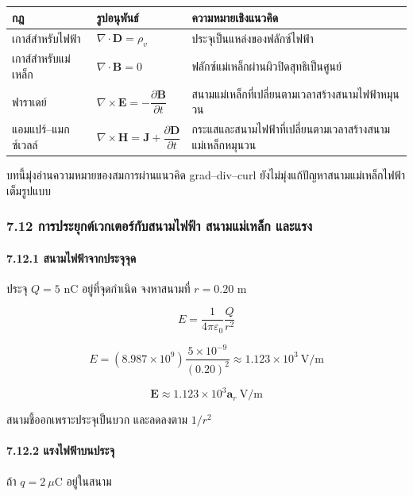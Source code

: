 \begin{table}[htbp]
    \centering
    \begin{tabularx}{\textwidth}{L{0.20\textwidth} L{0.28\textwidth} Y}
        \hline
        \textbf{กฎ} & \textbf{รูปอนุพันธ์} & \textbf{ความหมายเชิงแนวคิด} \\
        \hline
        เกาส์สำหรับไฟฟ้า & \(\nabla\cdot\mathbf{D}=\rho_v\) & ประจุเป็นแหล่งของฟลักซ์ไฟฟ้า \\
        เกาส์สำหรับแม่เหล็ก & \(\nabla\cdot\mathbf{B}=0\) & ฟลักซ์แม่เหล็กผ่านผิวปิดสุทธิเป็นศูนย์ \\
        ฟาราเดย์ & \(\nabla\times\mathbf{E}=-\dfrac{\partial\mathbf{B}}{\partial t}\) & สนามแม่เหล็กที่เปลี่ยนตามเวลาสร้างสนามไฟฟ้าหมุนวน \\
        แอมแปร์--แมกซ์เวลล์ & \(\nabla\times\mathbf{H}=\mathbf{J}+\dfrac{\partial\mathbf{D}}{\partial t}\) & กระแสและสนามไฟฟ้าที่เปลี่ยนตามเวลาสร้างสนามแม่เหล็กหมุนวน \\
        \hline
    \end{tabularx}
\end{table}

บทนี้มุ่งอ่านความหมายของสมการผ่านแนวคิด grad--div--curl ยังไม่มุ่งแก้ปัญหาสนามแม่เหล็กไฟฟ้าเต็มรูปแบบ

\subsubsection{7.12 การประยุกต์เวกเตอร์กับสนามไฟฟ้า สนามแม่เหล็ก และแรง}

\paragraph{7.12.1 สนามไฟฟ้าจากประจุจุด}

ประจุ \(Q=5\) nC อยู่ที่จุดกำเนิด จงหาสนามที่ \(r=0.20\) m

\[
E=\frac{1}{4\pi\varepsilon_0}\frac{Q}{r^2}
\]

\[
E=(8.987\times10^9)\frac{5\times10^{-9}}{(0.20)^2}
\approx1.123\times10^3\ \text{V/m}
\]

\[
\boxed{\mathbf{E}\approx1.123\times10^3\mathbf{a}_r\ \text{V/m}}
\]

สนามชี้ออกเพราะประจุเป็นบวก และลดลงตาม \(1/r^2\)

\paragraph{7.12.2 แรงไฟฟ้าบนประจุ}

ถ้า \(q=2\ \mu\text{C}\) อยู่ในสนาม

